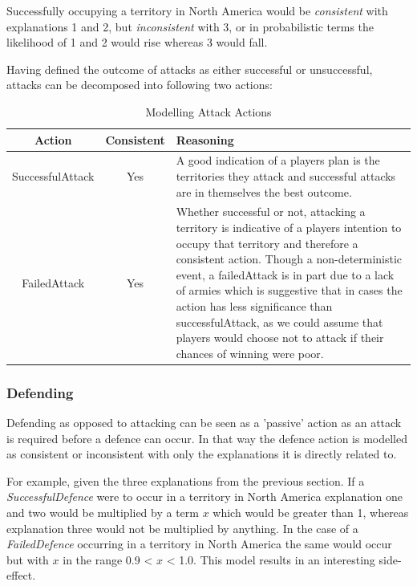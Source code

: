 \documentclass[parskip]{cs4rep}
\begin{document}
Successfully occupying a territory in North America would be \textit{consistent} with explanations 1 and 2, but \textit{inconsistent} with 3, or in probabilistic terms the likelihood of 1 and 2 would rise whereas 3 would fall.

Having defined the outcome of attacks as either successful or unsuccessful, attacks can be decomposed into following two actions: 

\begin{table}[ht]
\centering
\begin{tabular}{|c|c|p{8cm}|}
\hline 
\textbf{Action} & \textbf{Consistent}  & \textbf{Reasoning} \\ 
\hline 
SuccessfulAttack & Yes & A good indication of a players plan is the territories they attack and successful attacks are in themselves the best outcome. \\ 
\hline 
FailedAttack & Yes & Whether successful or not, attacking a territory is indicative of a players intention to occupy that territory and therefore a consistent action. Though a non-deterministic event, a failedAttack is in part due to a lack of armies which is suggestive that in cases the action has less significance than successfulAttack, as we could assume that players would choose not to attack if their chances of winning were poor.\\ 
\hline
\end{tabular}
\caption{Modelling Attack Actions}
\label{table:attack-modelling}
\end{table}

\newpage

\subsubsection{Defending}

Defending as opposed to attacking can be seen as a 'passive' action as an attack is required before a defence can occur. In that way the defence action is modelled as consistent or inconsistent with only the explanations it is directly related to. 

For example, given the three explanations from the previous section. If a \textit{SuccessfulDefence} were to occur in a territory in North America explanation one and two would be multiplied by a term $x$ which would be greater than 1, whereas explanation three would not be multiplied by anything. In the case of a \textit{FailedDefence} occurring in a territory in North America the same would occur but with $x$ in the range 0.9 < $x$ < 1.0. This model results in an interesting side-effect.
\end{document}
